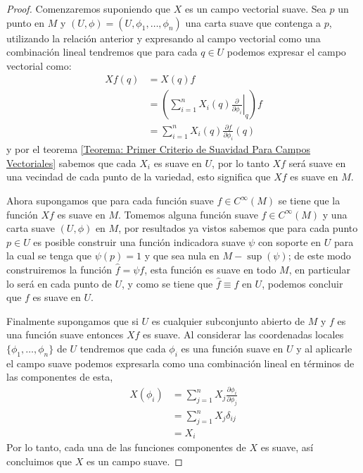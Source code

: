 \begin{proof}
	Comenzaremos suponiendo que $X$ es un campo vectorial suave. Sea $p$ un punto en $M$ y $(U,\phi) = (U,\phi_1,\ldots,\phi_n)$ una carta suave que contenga a $p$, utilizando la relación anterior y expresando al campo vectorial como una combinación lineal tendremos que para cada $q \in U$ podemos expresar el campo vectorial como:
	\begin{align*}
		Xf(q) & = X(q)f                                                       \\
		      & = \left(
		\sum_{i=1}^{n} X_i (q)
		\left.
		\frac{\partial}{\partial \phi_i}
		\right|_{q}
		\right) f                                                             \\
		      & = \sum_{i=1}^{n} X_i(q) \frac{\partial f}{\partial \phi_i}(q)
	\end{align*}
	y por el teorema \ref{Teorema: Primer Criterio de Suavidad Para Campos Vectoriales} sabemos que cada $X_i$ es suave en $U$, por lo tanto $Xf$ será suave en una vecindad de cada punto de la variedad, esto significa que $Xf$ es suave en $M$.

	Ahora supongamos que para cada función suave $f \in C^{\infty}(M)$ se tiene que la función $Xf$ es suave en $M$. Tomemos alguna función  suave $f \in C^{\infty}(M)$ y una carta suave $(U,\phi)$ en $M$, por resultados ya vistos sabemos que para cada punto $p \in U$ es posible construir una función indicadora suave $\psi$ con soporte en $U$ para la cual se tenga que $\psi(p) = 1$ y que sea nula en $M - \sup(\psi)$; de este modo construiremos la función $\hat{f} = \psi f$, esta función es suave en todo $M$, en particular lo será en cada punto de $U$, y como se tiene que $\hat{f} \equiv f$ en $U$, podemos concluir que $f$ es suave en $U$.

	Finalmente supongamos que si $U$ es cualquier subconjunto abierto de $M$ y $f$ es una función suave entonces $Xf$ es suave. Al considerar las coordenadas locales $\{\phi_1, \ldots, \phi_n\}$ de $U$ tendremos que cada $\phi_i$ es una función suave en $U$ y al aplicarle el campo suave podemos expresarla como una combinación lineal en términos de las componentes de esta,
	\begin{align*}
		X(\phi_i) & = \sum_{j=1}^{n} X_j \frac{\partial \phi_i}{\partial \phi_j} \\
		          & = \sum_{j=1}^{n} X_j \delta_{ij}                             \\
		          & = X_i
	\end{align*}
	Por lo tanto, cada una de las funciones componentes de $X$ es suave, así concluimos que $X$ es un campo suave.
\end{proof}

